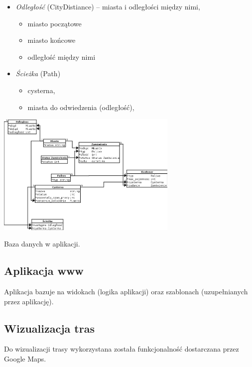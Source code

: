 \documentclass[11pt,a4paper,oneside]{mwart}
\begin{document}
\begin{itemize}
\begin{itemize}
    \end{itemize}
    \item \emph{Odległość} (CityDistiance) -- miasta i odległości między nimi,
    \begin{itemize}
      \item miasto początowe
      \item miasto końcowe
      \item odległość między nimi
    \end{itemize}
    \item \emph{Ścieżka} (Path) 
    \begin{itemize}
      \item cysterna,
      \item miasta do odwiedzenia (odległość),
    \end{itemize}
\end{itemize}

\begin{schemat}
  \centering
  \includegraphics[width=0.65\textwidth]{pics/baza.png}
  \caption{Baza danych w aplikacji.}
  \label{fig:baza}
\end{schemat}

\subsection{Aplikacja www}
Aplikacja bazuje na widokach (logika aplikacji) oraz szablonach (uzupełnianych przez aplikację).  

\subsection{Wizualizacja tras}

  Do wizualizacji trasy wykorzystana została funkcjonalność dostarczana przez Google Maps. 
\end{document}

